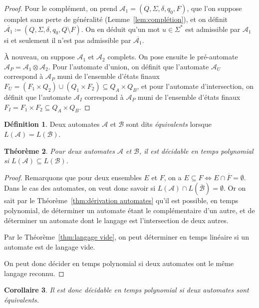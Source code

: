 \documentclass{article}
\newtheorem{thm}{Théorème}[section]
\newtheorem{cor}[thm]{Corollaire}
\theoremstyle{definition}
\newtheorem{déf}[thm]{Définition}
\theoremstyle{remark}
\newcommand{\automaton}{(Q, \Sigma, \delta, q_0, F)}
\begin{document}
	\begin{proof} Pour le complément, on prend $\mathcal A_1 = \automaton$, que l'on suppose complet sans perte de généralité (Lemme~\ref{lem:complétion}), et
	on définit $\overline {\mathcal A_1} \coloneqq (Q, \Sigma, \delta, q_0, Q \setminus F)$. On en déduit qu'un mot $u \in \Sigma^*$ est admissible par $\mathcal A_1$
	si et seulement il n'est pas admissible par $\overline {\mathcal A_1}$.

	À nouveau, on suppose $\mathcal A_1$ et $\mathcal A_2$ complets. On pose ensuite le pré-automate $\mathcal A_P = \mathcal A_1 \otimes \mathcal A_2$. Pour
	l'automate d'union, on définit que l'automate $\mathcal A_U$ correspond à $\mathcal A_P$ muni de l'ensemble d'états finaux
	$F_U = (F_1 \times Q_2) \cup (Q_1 \times F_2) \subseteq Q_A \times Q_B$, et pour l'automate d'intersection, on définit que l'automate $\mathcal A_I$
	correspond à $\mathcal A_P$ muni de l'ensemble d'états finaux $F_I = F_1 \times F_2 \subseteq Q_A \times Q_B$.
	\end{proof}

	\begin{déf} Deux automates $\mathcal A$ et $\mathcal B$ sont dits \textit{équivalents} lorsque $L(\mathcal A) = L(\mathcal B)$.
	\end{déf}

	\begin{thm} Pour deux automates $\mathcal A$ et $\mathcal B$, il est décidable en temps polynomial si $L(\mathcal A) \subseteq L(\mathcal B)$.
	\end{thm}

	\begin{proof} Remarquons que pour deux ensembles $E$ et $F$, on a $E \subseteq F \iff E \cap \overline F = \emptyset$. Dans le cas des automates, on veut
	donc savoir si $L(\mathcal A) \cap L(\overline {\mathcal B}) = \emptyset$. Or on sait par le Théorème~\ref{thm:dérivation automates} qu'il est possible, en
	temps polynomial, de déterminer un automate étant le complémentaire d'un autre, et de déterminer un automate dont le langage est l'intersection de deux autres.

	Par le Théorème~\ref{thm:langage vide}, on peut déterminer en temps linéaire si un automate est de langage vide.

	On peut donc décider en temps polynomial si deux automates ont le même langage reconnu.
	\end{proof}

	\begin{cor} Il est donc décidable en temps polynomial si deux automates sont équivalents.
	\end{cor}
\end{document}
